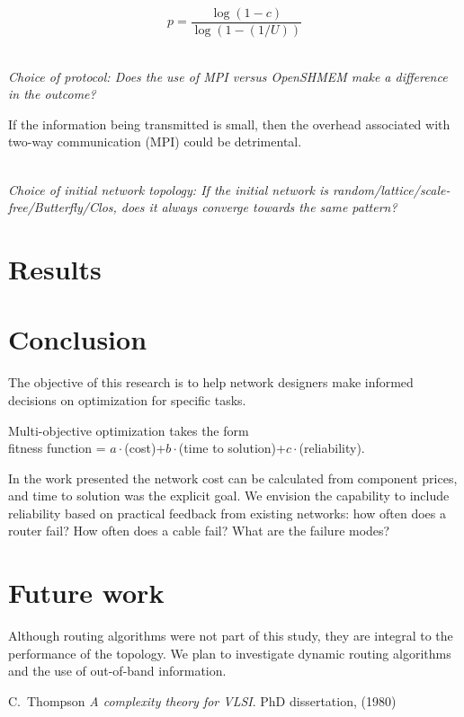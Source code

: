 \documentclass[pdftex]{article}
\begin{document}
\begin{equation}
 p = \frac{\log(1-c)}{\log(1-(1/U))}
\end{equation}

\ \\
\textit{Choice of protocol: Does the use of MPI versus OpenSHMEM make a difference in the outcome?}

If the information being transmitted is small, then the overhead associated with two-way communication (MPI) could be detrimental. 

\ \\
\textit{Choice of initial network topology: If the initial network is random/lattice/scale-free/Butterfly/Clos, does it always converge towards the same pattern?}

\section{Results}

\section{Conclusion}

The objective of this research is to help network designers make informed decisions on optimization for specific tasks. 

Multi-objective optimization takes the form\\
fitness function = $a\cdot$(cost)+$b\cdot$(time to solution)+$c\cdot$(reliability).

In the work presented the network cost can be calculated from component prices, and time to solution was the explicit goal. We envision the capability to include reliability based on practical feedback from existing networks: how often does a router fail? How often does a cable fail? What are the failure modes?

\section{Future work}

Although routing algorithms were not part of this study, they are integral to the performance of the topology. We plan to investigate dynamic routing algorithms and the use of out-of-band information. 

\begin{thebibliography}{99}

C.~Thompson \textit{A complexity theory for VLSI}. PhD dissertation, (1980)

\end{thebibliography}
\end{document}

